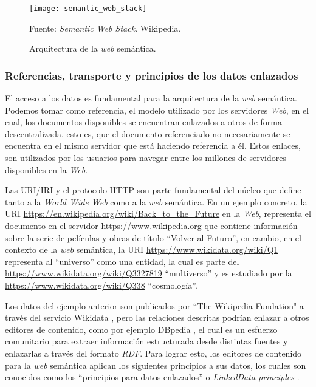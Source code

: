 \begin{figure}
    \centering
    \texttt{[image: semantic\_web\_stack]}
    \caption{Arquitectura de la \textit{web} semántica.} Fuente:
    \textit{Semantic Web Stack}. Wikipedia.
    \label{fig:semantic-web-arq}
\end{figure}

\subsubsection{Referencias, transporte y principios de los datos enlazados}
\label{sec:refs-transporte-enlazados}

El acceso a los datos es fundamental para la arquitectura de la \textit{web}
semántica. Podemos tomar como referencia, el modelo utilizado por los servidores
\textit{Web}, en el cual, los documentos disponibles se encuentran enlazados a
otros de forma descentralizada, esto es, que el documento referenciado no
necesariamente se encuentra en el mismo servidor que está haciendo referencia a
él. Estos enlaces, son utilizados por los usuarios para navegar entre los
millones de servidores disponibles en la \textit{Web}.

Las URI/IRI y el protocolo HTTP son parte fundamental del núcleo que define
tanto a la \textit{World Wide Web} como a la \textit{web} semántica. En un
ejemplo concreto, la URI \url{https://en.wikipedia.org/wiki/Back_to_the_Future}
en la \textit{Web}, representa el documento en el servidor
\url{https://www.wikipedia.org} que contiene información sobre la serie de
películas y obras de título ``Volver al Futuro'', en cambio, en el contexto de
la \textit{web} semántica, la URI \url{https://www.wikidata.org/wiki/Q1}
representa al ``universo'' como una entidad, la cual es parte del
\url{https://www.wikidata.org/wiki/Q3327819} ``multiverso'' y es estudiado por
la \url{https://www.wikidata.org/wiki/Q338} ``cosmología''.

Los datos del ejemplo anterior son publicados por ``The Wikipedia Fundation" a
través del servicio Wikidata \cite{vrandevcic2014wikidata}, pero las relaciones
descritas podrían enlazar a otros editores de contenido, como por ejemplo
DBpedia \cite{valsecchi2015dbpedia}, el cual es un esfuerzo comunitario para
extraer información estructurada desde distintas fuentes y enlazarlas a través
del formato \textit{RDF}. Para lograr esto, los editores de contenido para la
\textit{web} semántica aplican los siguientes principios a sus datos, los cuales
son conocidos como los ``principios para datos enlazados'' o \textit{LinkedData
principles} \cite{bizer2011linked}.

